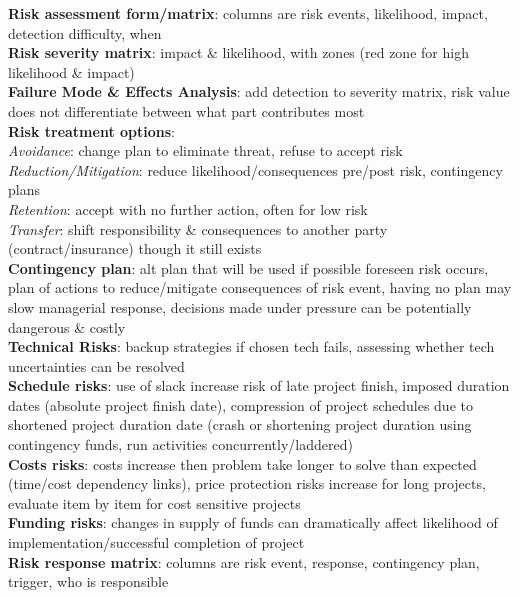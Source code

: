 \documentclass[a4paper]{article}
\begin{document}
\begin{multicols}{3}
        \textbf{Risk assessment form/matrix}: columns are risk events, likelihood, impact, detection difficulty, when\\
        \textbf{Risk severity matrix}: impact \& likelihood, with zones (red zone for high likelihood \& impact)\\
        \textbf{Failure Mode \& Effects Analysis}: add detection to severity matrix, risk value does not differentiate between what part contributes most\\
        \textbf{Risk treatment options}:\\
        \textit{Avoidance}: change plan to eliminate threat, refuse to accept risk\\
        \textit{Reduction/Mitigation}: reduce likelihood/consequences pre/post risk, contingency plans\\
        \textit{Retention}: accept with no further action, often for low risk\\
        \textit{Transfer}: shift responsibility \& consequences to another party (contract/insurance) though it still exists\\
        \textbf{Contingency plan}: alt plan that will be used if possible foreseen risk occurs, plan of actions to reduce/mitigate consequences of risk event, having no plan may slow managerial response, decisions made under pressure can be potentially dangerous \& costly\\
        \textbf{Technical Risks}: backup strategies if chosen tech fails, assessing whether tech uncertainties can be resolved\\
        \textbf{Schedule risks}: use of slack increase risk of late project finish, imposed duration dates (absolute project finish date), compression of project schedules due to shortened project duration date (crash or shortening project duration using contingency funds, run activities concurrently/laddered)\\
        \textbf{Costs risks}: costs increase then problem take longer to solve than expected (time/cost dependency links), price protection risks increase for long projects, evaluate item by item for cost sensitive projects\\
        \textbf{Funding risks}: changes in supply of funds can dramatically affect likelihood of implementation/successful completion of project\\
        \textbf{Risk response matrix}: columns are risk event, response, contingency plan, trigger, who is responsible\\

\end{multicols}
\end{document}
